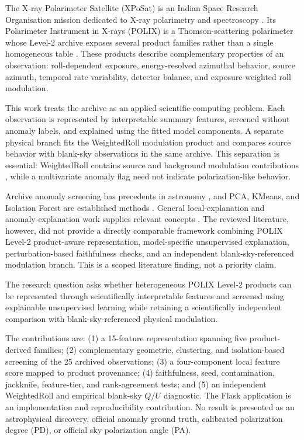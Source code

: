 \documentclass[conference]{IEEEtran}
\begin{document}
The X-ray Polarimeter Satellite (XPoSat) is an Indian Space Research Organisation mission dedicated to X-ray polarimetry and spectroscopy \cite{isro_xposat_2023,saini2025xposat}. Its Polarimeter Instrument in X-rays (POLIX) is a Thomson-scattering polarimeter whose Level-2 archive exposes several product families rather than a single homogeneous table \cite{polix_handbook_2025,rishin2010thomson,fabiani2018instrumentation}. These products describe complementary properties of an observation: roll-dependent exposure, energy-resolved azimuthal behavior, source azimuth, temporal rate variability, detector balance, and exposure-weighted roll modulation.

This work treats the archive as an applied scientific-computing problem. Each observation is represented by interpretable summary features, screened without anomaly labels, and explained using the fitted model components. A separate physical branch fits the WeightedRoll modulation product and compares source behavior with blank-sky observations in the same archive. This separation is essential: WeightedRoll contains source and background modulation contributions \cite{polix_handbook_2025}, while a multivariate anomaly flag need not indicate polarization-like behavior.

Archive anomaly screening has precedents in astronomy \cite{baron2017weirdest,lochner2021astronomaly}, and PCA, KMeans, and Isolation Forest are established methods \cite{pearson1901pca,macqueen1967kmeans,liu2008isolation}. General local-explanation and anomaly-explanation work supplies relevant concepts \cite{lundberg2017shap,yepmo2022anomaly,yeh2019infidelity}. The reviewed literature, however, did not provide a directly comparable framework combining POLIX Level-2 product-aware representation, model-specific unsupervised explanation, perturbation-based faithfulness checks, and an independent blank-sky-referenced modulation branch. This is a scoped literature finding, not a priority claim.

The research question asks whether heterogeneous POLIX Level-2 products can be represented through scientifically interpretable features and screened using explainable unsupervised learning while retaining a scientifically independent comparison with blank-sky-referenced physical modulation.

The contributions are: (1) a 15-feature representation spanning five product-derived families; (2) complementary geometric, clustering, and isolation-based screening of the 25 archived observations; (3) a four-component local feature score mapped to product provenance; (4) faithfulness, seed, contamination, jackknife, feature-tier, and rank-agreement tests; and (5) an independent WeightedRoll and empirical blank-sky \(Q/U\) diagnostic. The Flask application is an implementation and reproducibility contribution. No result is presented as an astrophysical discovery, official anomaly ground truth, calibrated polarization degree (PD), or official sky polarization angle (PA).
\end{document}

